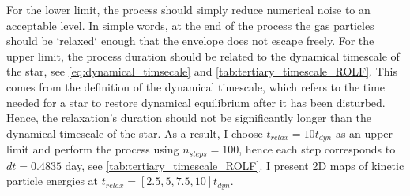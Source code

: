 For the lower limit, the process should simply reduce numerical noise to an acceptable level. In simple words, at the end of the process the gas particles should be `relaxed` enough that the envelope does not escape freely. For the upper limit, the process duration should be related to the dynamical timescale of the star, see \cref{eq:dynamical_timsecale} and \cref{tab:tertiary_timescale_ROLF}. This comes from the definition of the dynamical timescale, which refers to the time needed for a star to restore dynamical equilibrium after it has been disturbed. Hence, the relaxation's duration should not be significantly longer than the dynamical timescale of the star. As a result, I choose  $t_{relax} = 10 t_{dyn}$ as an upper limit and perform the process using $n_{steps} = 100$, hence each step corresponds to $dt=0.4835$ day, see \cref{tab:tertiary_timescale_ROLF}. I present 2D maps of kinetic particle energies at $t_{relax} =[2.5, 5, 7.5, 10] t_{dyn}$.
